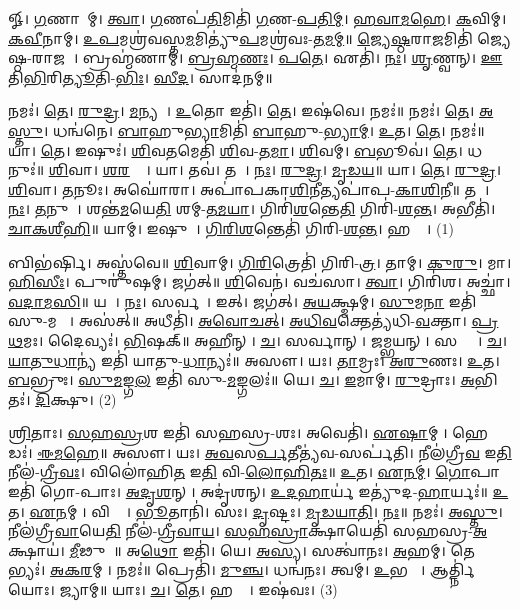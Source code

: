 
𑍐। \ul{𑌗}𑌣𑌾𑌨𑌾᳚𑌮𑍍। \ul{𑌤𑍍𑌵𑌾}। \ul{𑌗}𑌣𑌪॑\ul{𑌤𑌿}𑌮𑌿𑌤𑌿॑ \ul{𑌗}𑌣-\ul{𑌪}\ul{𑌤𑌿}\ul{𑌮𑍍}। \ul{𑌹}\ul{𑌵𑌾}\ul{𑌮}\ul{𑌹𑍇}। \ul{𑌕}𑌵𑌿𑌮𑍍। \ul{𑌕}\ul{𑌵𑍀}𑌨𑌾𑌮𑍍। \ul{𑌉}\ul{𑌪}𑌮𑌶𑍍𑌰॑𑌵𑌸𑍍𑌤\ul{𑌮}𑌮𑌿𑌤𑍍𑌯𑍁॑\ul{𑌪}𑌮𑌶𑍍𑌰॑𑌵𑌃-\ul{𑌤}\ul{𑌮}\ul{𑌮𑍍}॥ 
\ul{𑌜𑍍𑌯𑍇}\ul{𑌷𑍍𑌠}𑌰𑌾\ul{𑌜}𑌮𑌿𑌤𑌿॑ 𑌜𑍍𑌯𑍇𑌷𑍍𑌠-𑌰𑌾𑌜𑌮𑍍᳚। 𑌬𑍍𑌰𑌹𑍍𑌮॑𑌣𑌾𑌮𑍍। \ul{𑌬𑍍𑌰}\ul{𑌹𑍍𑌮}\ul{𑌣𑌃}। \ul{𑌪}\ul{𑌤𑍇}। 𑌏𑌤𑌿॑। \ul{𑌨𑌃}। \ul{𑌶𑍃}𑌣𑍍𑌵𑌨𑍍। \ul{𑌊}𑌤𑌿\ul{𑌭𑌿}𑌰𑌿\ul{𑌤𑍍𑌯𑍂}𑌤𑌿-\ul{𑌭𑌿𑌃}। \ul{𑌸𑍀}\ul{𑌦}। 𑌸𑌾𑌦॑𑌨𑌮𑍍॥ 


𑌨𑌮𑌃॑। \ul{𑌤𑍇}। \ul{𑌰𑍁}\ul{𑌦𑍍𑌰}। \ul{𑌮}𑌨𑍍𑌯𑌵𑍇᳚। \ul{𑌉}𑌤𑍋 𑌇𑌤𑌿॑। \ul{𑌤𑍇}। 𑌇𑌷॑𑌵𑍇। 𑌨𑌮𑌃॑॥ 
𑌨𑌮𑌃॑। \ul{𑌤𑍇}। \ul{𑌅}\ul{𑌸𑍍𑌤𑍁}। 𑌧𑌨𑍍𑌵॑𑌨𑍇। \ul{𑌬𑌾}𑌹𑍁\ul{𑌭𑍍𑌯𑌾}𑌮𑌿𑌤𑌿॑ \ul{𑌬𑌾}𑌹𑍁-\ul{𑌭𑍍𑌯𑌾}\ul{𑌮𑍍}। \ul{𑌉}𑌤। \ul{𑌤𑍇}। 𑌨𑌮𑌃॑॥ 
𑌯𑌾। \ul{𑌤𑍇}। 𑌇𑌷𑍁𑌃॑। \ul{𑌶𑌿}𑌵\ul{𑌤}𑌮𑍇𑌤𑌿॑ \ul{𑌶𑌿}𑌵-\ul{𑌤}\ul{𑌮𑌾}। \ul{𑌶𑌿}𑌵𑌮𑍍। \ul{𑌬}𑌭𑍂𑌵॑। \ul{𑌤𑍇}। 𑌧𑌨𑍁𑌃॑॥ 
\ul{𑌶𑌿}𑌵𑌾। \ul{𑌶}\ul{𑌰}𑌵𑍍𑌯𑌾᳚। 𑌯𑌾। 𑌤𑌵॑। 𑌤𑌯𑌾᳚। \ul{𑌨𑌃}। \ul{𑌰𑍁}\ul{𑌦𑍍𑌰}। \ul{𑌮𑍃}\ul{𑌡}\ul{𑌯}॥ 
𑌯𑌾। \ul{𑌤𑍇}। \ul{𑌰𑍁}\ul{𑌦𑍍𑌰}। \ul{𑌶𑌿}𑌵𑌾। \ul{𑌤}𑌨𑍂𑌃। 𑌅𑌘𑍋॑𑌰𑌾। 𑌅𑌪𑌾॑𑌪𑌕𑌾\ul{𑌶𑌿}𑌨𑍀𑌤𑍍𑌯𑌪𑌾॑𑌪-\ul{𑌕𑌾}\ul{𑌶𑌿}\ul{𑌨𑍀}॥ 
𑌤𑌯𑌾᳚। \ul{𑌨𑌃}। \ul{𑌤}𑌨𑍁𑌵𑌾᳚। 𑌶𑌨𑍍𑌤॑\ul{𑌮}𑌯𑍇\ul{𑌤𑌿} 𑌶𑌮𑍍-\ul{𑌤}\ul{𑌮}\ul{𑌯𑌾}। 𑌗𑌿𑌰𑌿॑\ul{𑌶}𑌨𑍍𑌤𑍇\ul{𑌤𑌿} 𑌗𑌿𑌰𑌿॑-\ul{𑌶}\ul{𑌨𑍍𑌤}। 𑌅𑌭𑍀𑌤𑌿॑। \ul{𑌚𑌾}\ul{𑌕}\ul{𑌶𑍀}\ul{𑌹𑌿}॥ 
𑌯𑌾𑌮𑍍। 𑌇𑌷𑍁𑌮𑍍᳚। \ul{𑌗𑌿}\ul{𑌰𑌿}\ul{𑌶}𑌨𑍍𑌤𑍇𑌤𑌿॑ 𑌗𑌿𑌰𑌿-\ul{𑌶}\ul{𑌨𑍍𑌤}। 𑌹𑌸𑍍𑌤𑍇᳚। (1)


𑌬𑌿𑌭॑𑌰𑍍𑌷𑌿। 𑌅𑌸𑍍𑌤॑𑌵𑍇॥ 
\ul{𑌶𑌿}𑌵𑌾𑌮𑍍। \ul{𑌗𑌿}\ul{𑌰𑌿}𑌤𑍍𑌰𑍇𑌤𑌿॑ 𑌗𑌿𑌰𑌿-\ul{𑌤𑍍𑌰}। 𑌤𑌾𑌮𑍍। \ul{𑌕𑍁}\ul{𑌰𑍁}। 𑌮𑌾। \ul{𑌹𑌿}\ul{}\ul{𑌸𑍀𑌃}। 𑌪𑍁𑌰𑍁॑𑌷𑌮𑍍। 𑌜𑌗॑𑌤𑍍॥ 
\ul{𑌶𑌿}𑌵𑍇𑌨॑। 𑌵𑌚॑𑌸𑌾। \ul{𑌤𑍍𑌵𑌾}। 𑌗𑌿𑌰𑌿॑𑌶। 𑌅𑌚𑍍𑌛𑌾॑। \ul{𑌵}\ul{𑌦𑌾}\ul{𑌮}\ul{𑌸𑌿}॥ 
𑌯𑌥𑌾᳚। \ul{𑌨𑌃}। 𑌸𑌰𑍍𑌵𑌮𑍍᳚। 𑌇𑌤𑍍। 𑌜𑌗॑𑌤𑍍। \ul{𑌅}\ul{𑌯}𑌕𑍍𑌷𑍍𑌮𑌮𑍍। \ul{𑌸𑍁}𑌮\ul{𑌨𑌾} 𑌇𑌤𑌿॑ 𑌸𑍁-𑌮𑌨𑌾𑌃᳚। 𑌅𑌸॑𑌤𑍍॥ 
𑌅𑌧𑍀𑌤𑌿॑। \ul{𑌅}\ul{𑌵𑍋}\ul{𑌚}\ul{𑌤𑍍}। \ul{𑌅}\ul{𑌧𑌿}\ul{𑌵}𑌕𑍍𑌤𑍇𑌤𑍍𑌯॑𑌧𑌿-\ul{𑌵}𑌕𑍍𑌤𑌾। \ul{𑌪𑍍𑌰}\ul{𑌥}𑌮𑌃। 𑌦𑍈𑌵𑍍𑌯𑌃॑। \ul{𑌭𑌿}𑌷𑌕𑍍॥ 
𑌅𑌹𑍀𑌨𑍍। \ul{𑌚}। 𑌸𑌰𑍍𑌵𑌾𑌨𑍍। \ul{𑌜}𑌮𑍍𑌭𑌯𑌨𑍍। 𑌸𑌰𑍍𑌵𑌾𑌃᳚। \ul{𑌚}। \ul{𑌯𑌾}\ul{𑌤𑍁}\ul{𑌧𑌾}𑌨𑍍𑌯॑ 𑌇𑌤𑌿॑ 𑌯𑌾𑌤𑍁-\ul{𑌧𑌾}𑌨𑍍𑌯𑌃॑॥ 
𑌅𑌸𑍗। 𑌯𑌃। \ul{𑌤𑌾}𑌮𑍍𑌰𑌃। \ul{𑌅}\ul{𑌰𑍁}𑌣𑌃। \ul{𑌉}𑌤। \ul{𑌬}𑌭𑍍𑌰𑍁𑌃। \ul{𑌸𑍁}\ul{𑌮}𑌙𑍍𑌗\ul{𑌲} 𑌇𑌤𑌿॑ 𑌸𑍁-\ul{𑌮}𑌙𑍍𑌗𑌲𑌃॑॥ 
𑌯𑍇। \ul{𑌚}। \ul{𑌇}𑌮𑌾𑌮𑍍। \ul{𑌰𑍁}𑌦𑍍𑌰𑌾𑌃। \ul{𑌅}𑌭𑌿𑌤𑌃॑। \ul{𑌦𑌿}𑌕𑍍𑌷𑍁। (2)


\ul{𑌶𑍍𑌰𑌿}𑌤𑌾𑌃। \ul{𑌸}\ul{𑌹}\ul{𑌸𑍍𑌰}𑌶 𑌇𑌤𑌿॑ 𑌸𑌹𑌸𑍍𑌰-𑌶𑌃। 𑌅𑌵𑍇𑌤𑌿॑। \ul{𑌏}\ul{𑌷𑌾}𑌮𑍍। 𑌹𑍇𑌡𑌃॑। \ul{𑌈}\ul{𑌮}\ul{𑌹𑍇}॥ 
𑌅𑌸𑍗। 𑌯𑌃। \ul{𑌅}\ul{𑌵}𑌸\ul{𑌰𑍍𑌪}𑌤𑍀𑌤𑍍𑌯॑𑌵-𑌸𑌰𑍍𑌪॑𑌤𑌿। 𑌨𑍀𑌲॑𑌗𑍍𑌰𑍀\ul{𑌵} 𑌇\ul{𑌤𑌿} 𑌨𑍀𑌲॑-\ul{𑌗𑍍𑌰𑍀}\ul{𑌵𑌃}। 𑌵𑌿𑌲𑍋॑𑌹𑌿\ul{𑌤} 𑌇\ul{𑌤𑌿} 𑌵𑌿-\ul{𑌲𑍋}\ul{𑌹𑌿}\ul{𑌤𑌃}॥ 
\ul{𑌉}𑌤। \ul{𑌏}\ul{𑌨}\ul{𑌮𑍍}। \ul{𑌗𑍋}𑌪𑌾 𑌇𑌤𑌿॑ 𑌗𑍋-𑌪𑌾𑌃। \ul{𑌅}\ul{𑌦𑍃}\ul{𑌶}𑌨𑍍। 𑌅𑌦𑍃॑𑌶𑌨𑍍। \ul{𑌉}\ul{𑌦}\ul{𑌹𑌾}𑌰𑍍𑌯॑ 𑌇𑌤𑍍𑌯𑍁॑𑌦-\ul{𑌹𑌾}𑌰𑍍𑌯𑌃॑॥ 
\ul{𑌉}𑌤। \ul{𑌏}\ul{𑌨}𑌮𑍍। 𑌵𑌿𑌶𑍍𑌵𑌾᳚। \ul{𑌭𑍂}𑌤𑌾𑌨𑌿॑। 𑌸𑌃। \ul{𑌦𑍃}𑌷𑍍𑌟𑌃। \ul{𑌮𑍃}\ul{𑌡}\ul{𑌯𑌾}\ul{𑌤𑌿}। \ul{𑌨𑌃}॥ 
𑌨𑌮𑌃॑। \ul{𑌅}\ul{𑌸𑍍𑌤𑍁}। 𑌨𑍀𑌲॑𑌗𑍍𑌰𑍀\ul{𑌵𑌾}𑌯𑍇\ul{𑌤𑌿} 𑌨𑍀𑌲॑-\ul{𑌗𑍍𑌰𑍀}\ul{𑌵𑌾}\ul{𑌯}। \ul{𑌸}\ul{𑌹}\ul{𑌸𑍍𑌰𑌾}𑌕𑍍𑌷𑌾𑌯𑍇𑌤𑌿॑ 𑌸𑌹𑌸𑍍𑌰-\ul{𑌅}𑌕𑍍𑌷𑌾𑌯॑। \ul{𑌮𑍀}𑌢𑍁𑌷𑍇᳚॥
𑌅\ul{𑌥𑍋} 𑌇𑌤𑌿॑। 𑌯𑍇। \ul{𑌅}\ul{𑌸𑍍𑌯}। 𑌸𑌤𑍍𑌵𑌾॑𑌨𑌃। \ul{𑌅}𑌹𑌮𑍍। 𑌤𑍇𑌭𑍍𑌯𑌃॑। \ul{𑌅}\ul{𑌕}\ul{𑌰}𑌮𑍍। 𑌨𑌮𑌃॑॥ 
𑌪𑍍𑌰𑍇𑌤𑌿॑। \ul{𑌮𑍁}\ul{𑌞𑍍𑌚}। 𑌧𑌨𑍍𑌵॑𑌨𑌃। 𑌤𑍍𑌵𑌮𑍍। \ul{𑌉}𑌭𑌯𑍋𑌃᳚। 𑌆𑌰𑍍𑌤𑍍𑌨𑌿॑𑌯𑍋𑌃। 𑌜𑍍𑌯𑌾𑌮𑍍॥ 
𑌯𑌾𑌃। \ul{𑌚}। \ul{𑌤𑍇}। 𑌹𑌸𑍍𑌤𑍇᳚। 𑌇𑌷॑𑌵𑌃। (3)


